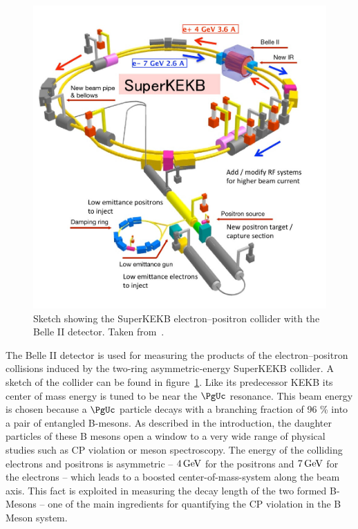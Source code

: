 \begin{figure}
 \centering
 \includegraphics[height=0.4\textheight]{figures/experimental_setup/superkekb.jpg}
 \caption[Sketch showing the SuperKEKB electron--positron collider.]{Sketch showing the SuperKEKB electron--positron collider with the Belle II detector. Taken from~\cite{DesyWebseite}.}
 \label{fig-superkekb}
\end{figure}


The Belle II detector is used for measuring the products of the electron--positron collisions induced by the two-ring asymmetric-energy SuperKEKB collider. A sketch of the collider can be found in figure~\ref{fig-superkekb}. Like its predecessor KEKB its center of mass energy is tuned to be near the $\PgUc$ resonance. This beam energy is chosen because a $\PgUc$ particle decays with a branching fraction of 96 \% into a pair of entangled B-mesons. As described in the introduction, the daughter particles of these B mesons open a window to a very wide range of physical studies such as CP violation or meson spectroscopy. The energy of the colliding electrons and positrons is asymmetric -- $\unit[4]{GeV}$ for the positrons and $\unit[7]{GeV}$ for the electrons -- which leads to a boosted center-of-mass-system along the beam axis. This fact is exploited in measuring the decay length of the two formed B-Mesons -- one of the main ingredients for quantifying the CP violation in the B Meson system. 

